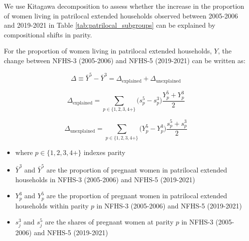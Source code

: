 \documentclass[12pt]{article}
\begin{document}
We use Kitagawa decomposition \citep{kitagawa1955components} to assess whether the increase in the proportion of women living in patrilocal extended households observed between 2005-2006 and 2019-2021 in Table \ref{tab:patrilocal_subgroups} can be explained by compositional shifts in parity. 

For the proportion of women living in patrilocal extended households, $Y$, the change between NFHS-3 (2005-2006) and NFHS-5 (2019-2021) can be written as:

\begin{equation}
\Delta \equiv \bar Y^{5} - \bar Y^{3}
= \Delta_{\text{explained}} + \Delta_{\text{unexplained}}
\end{equation}

\begin{equation}
\Delta_{\text{explained}} =
\sum_{p \in \{1,2,3,4+\}} \big(s_p^{5} - s_p^{3}\big)\frac{Y_p^{5} + Y_p^{3}}{2}
\end{equation}

\begin{equation}
\Delta_{\text{unexplained}} =
\sum_{p \in \{1,2,3,4+\}} \big(Y_p^{5} - Y_p^{3}\big)\frac{s_p^{5} + s_p^{3}}{2}
\end{equation}

\begin{itemize}
    \item where $p \in \{1,2,3,4+\}$ indexes parity
    \item $\bar Y^{3}$ and $\bar Y^{5}$ are the proportion of pregnant women in patrilocal extended households in NFHS-3 (2005-2006) and NFHS-5 (2019-2021)
    \item $Y_p^{3}$ and $Y_p^{5}$ are the proportion of pregnant women in patrilocal extended households within parity $p$ in NFHS-3 (2005-2006) and NFHS-5 (2019-2021)
    \item $s_j^{3}$ and $s_j^{5}$ are the shares of pregnant women at parity $p$ in NFHS-3 (2005-2006) and NFHS-5 (2019-2021)
\end{itemize}
\end{document}

